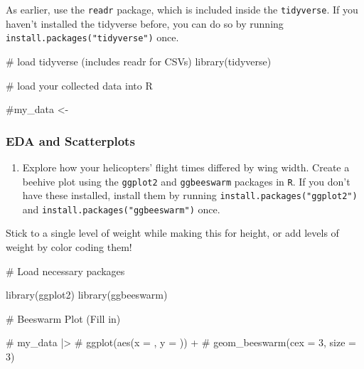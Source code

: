 \documentclass[
  letterpaper,
  DIV=11,
  numbers=noendperiod]{scrartcl}
\newenvironment{Shaded}{\begin{snugshade}}{\end{snugshade}}
\newcommand{\CommentTok}[1]{\textcolor[rgb]{0.37,0.37,0.37}{#1}}
\newcommand{\FunctionTok}[1]{\textcolor[rgb]{0.28,0.35,0.67}{#1}}
\newcommand{\NormalTok}[1]{\textcolor[rgb]{0.00,0.23,0.31}{#1}}
\providecommand{\tightlist}{%
  \setlength{\itemsep}{0pt}\setlength{\parskip}{0pt}}
\begin{document}
As earlier, use the \texttt{readr} package, which is included inside the
\texttt{tidyverse}. If you haven't installed the tidyverse before, you
can do so by running \texttt{install.packages("tidyverse")} once.

\begin{Shaded}
\begin{Highlighting}[]
\CommentTok{\# load tidyverse (includes readr for CSVs)}
\FunctionTok{library}\NormalTok{(tidyverse)}
\end{Highlighting}
\end{Shaded}

\begin{Shaded}
\begin{Highlighting}[]
\CommentTok{\# load your collected data into R}

\CommentTok{\#my\_data \textless{}{-} }
\end{Highlighting}
\end{Shaded}

\subsubsection{EDA and Scatterplots}\label{eda-and-scatterplots}

\begin{enumerate}
\def\labelenumi{\arabic{enumi}.}
\setcounter{enumi}{8}
\tightlist
\item
  Explore how your helicopters' flight times differed by wing width.
  Create a beehive plot using the \texttt{ggplot2} and
  \texttt{ggbeeswarm} packages in \texttt{R}. If you don't have these
  installed, install them by running
  \texttt{install.packages("ggplot2")} and
  \texttt{install.packages("ggbeeswarm")} once.
\end{enumerate}

Stick to a single level of weight while making this for height, or add
levels of weight by color coding them!

\begin{Shaded}
\begin{Highlighting}[]
\CommentTok{\# Load necessary packages}

\FunctionTok{library}\NormalTok{(ggplot2)}
\FunctionTok{library}\NormalTok{(ggbeeswarm)}

\CommentTok{\# Beeswarm Plot (Fill in)}

\CommentTok{\# my\_data |\textgreater{}}
\CommentTok{\#   ggplot(aes(x = , y = )) +}
\CommentTok{\#   geom\_beeswarm(cex = 3, size = 3)}
\end{Highlighting}
\end{Shaded}
\end{document}
